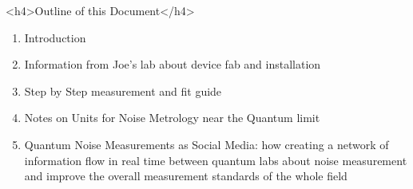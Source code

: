 \documentclass[11pt]{article}
\begin{document}
<h4>Outline of this Document</h4>
\begin{enumerate}

    \item
Introduction
    \item
Information from Joe's lab about device fab and installation
    \item
Step by Step measurement and fit guide
    \item
Notes on Units for Noise Metrology near the Quantum limit
    \item
Quantum Noise Measurements as Social Media: how creating a network of information flow in real time between quantum labs about noise measurement and improve the overall measurement standards of the whole field
\end{enumerate}
\end{document}

